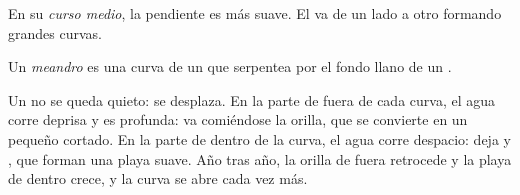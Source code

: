 En su \emph{curso medio}, la pendiente es más suave. El  va de un lado a
otro formando grandes curvas.

\begin{definition}[Meandro]\label{def:g5:water-shapes-the-land:meander}
Un \emph{meandro} es una curva de un  que serpentea por
el fondo llano de un .
\end{definition}

Un  no se queda quieto: se desplaza. En la parte de fuera de cada
curva, el agua corre deprisa y es profunda: va comiéndose la orilla, que se
convierte en un pequeño cortado. En la parte de dentro de la curva, el agua
corre despacio: deja  y , que forman una playa suave. Año tras
año, la orilla de fuera retrocede y la playa de dentro crece, y la curva se
abre cada vez más.

